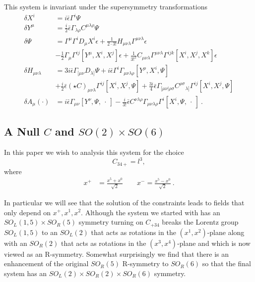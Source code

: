 \documentclass[12pt]{article}
\numberwithin{equation}{section}
\begin{document}
 This system is invariant under the  supersymmetry transformations
  \begin{align} \label{Constraints}
  \delta X^i &= i\bar\epsilon \Gamma^i\Psi\nonumber\\
  \delta Y^\mu  &= \frac{i}{2} \bar\epsilon \Gamma_{\lambda\rho}C^{\mu\lambda\rho}\Psi \nonumber\\  
  \delta \Psi  &= \Gamma^\mu\Gamma^i D_\mu X^i\epsilon + \frac{1}{2\cdot 3!}H_{\mu\nu\lambda}\Gamma^{\mu\nu\lambda}\epsilon\nonumber\\&-\frac{1}{2}\Gamma_\mu\Gamma^{ij}[Y^\mu,X^i,X^j]\epsilon +\frac{1}{3!^2} C_{\mu\nu\lambda}\Gamma^{\mu\nu\lambda}\Gamma^{ijk}[X^i,X^j,X^k] \epsilon\nonumber\\
  \delta H_{\mu\nu\lambda}  &= 3i\bar\epsilon \Gamma_{[\mu\nu}D_{\lambda]}\Psi + i \bar\epsilon \Gamma^i\Gamma_{\mu\nu\lambda\rho}[Y^\rho,X^i,\Psi]\nonumber\\&  +\frac{i}{2} \bar\epsilon (\star C)_{\mu\nu\lambda}\Gamma^{ij}[X^i,X^j,\Psi] + \frac{3i}{4}\bar\epsilon \Gamma_{[\mu\nu|\rho\sigma}C^{\rho\sigma}{}_{\lambda]}\Gamma^{ij}[X^i,X^j,\Psi] \nonumber\\
 \delta A_\mu(\cdot)  &= i\bar\epsilon\Gamma_{\mu\nu}[Y^\nu,\Psi,\ \cdot\ ] -\frac{i  }{3!} \bar\epsilon C^{\nu\lambda\rho}\Gamma_{\mu\nu\lambda\rho}\Gamma^i[X^i,\Psi,\ \cdot\ ]\ .
 \end{align}  


\subsection{A Null $C$ and $SO(2)\times SO(6)$}

In this paper we wish to analysis this system for the choice
 \begin{equation}\label{C}
C_{34+}=l^{3} ,
 \end{equation}
where 
\begin{align}
x^{+}&=\frac{x^{5}+ x^{0}}{\sqrt{2}}\qquad x^{-}=\frac{x^{5}- x^{0}}{\sqrt{2}}\ .
\end{align}




In particular we will see that the solution of the constraints leads to fields that only depend on $x^+,x^1,x^2$.  Although the system we started with has an $SO_L(1,5)\times SO_R(5)$ symmetry turning on $C_{+34}$ breaks the Lorentz group $SO_L(1,5)$ to an $SO_L(2)$ that acts as rotations in the $(x^1,x^2)$-plane along with an $SO_R(2)$ that acts as rotations in the $(x^3,x^4)$-plane and which is now viewed as an R-symmetry. Somewhat surprisingly we find that there is an enhancement of the original $SO_R(5)$ R-symmetry to $SO_R(6)$ so that the final system has an $SO_L(2)\times SO_R(2)\times SO_R(6)$ symmetry.
\end{document}
